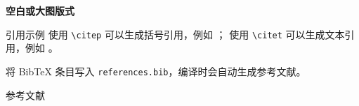 \documentclass[UTF8,fontset=fandol]{ctexbeamer}
\begin{document}

\begin{TIEVBlankFrame}
  \vspace*{0.70cm}
  \begin{center}
    {\fontsize{22}{28}\selectfont\bfseries 空白或大图版式\par}
    \vspace{0.45cm}
    \fbox{\rule{0pt}{4.15cm}\rule{10.6cm}{0pt}}
  \end{center}
\end{TIEVBlankFrame}

\begin{frame}[t,fragile]{引用示例}
  使用 \verb|\citep| 可以生成括号引用，例如 \citep{latexcompanion}；
  使用 \verb|\citet| 可以生成文本引用，例如 \citet{latexcompanion}。

  \vspace{0.35cm}
  将 BibTeX 条目写入 \verb|references.bib|，编译时会自动生成参考文献。
\end{frame}

\begin{frame}[allowframebreaks]{参考文献}
  
  
\end{frame}

\end{document}
